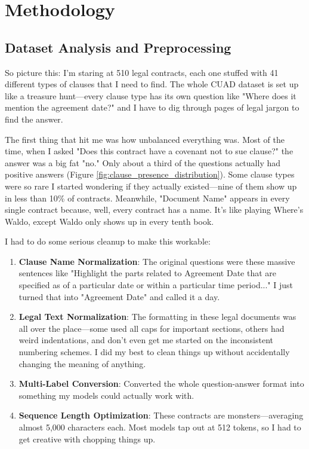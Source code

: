 \section{Methodology}

\subsection{Dataset Analysis and Preprocessing}

So picture this: I'm staring at 510 legal contracts, each one stuffed with 41 different types of clauses that I need to find. The whole CUAD dataset is set up like a treasure hunt—every clause type has its own question like "Where does it mention the agreement date?" and I have to dig through pages of legal jargon to find the answer.

The first thing that hit me was how unbalanced everything was. Most of the time, when I asked "Does this contract have a covenant not to sue clause?" the answer was a big fat "no." Only about a third of the questions actually had positive answers (Figure \ref{fig:clause_presence_distribution}). Some clause types were so rare I started wondering if they actually existed—nine of them show up in less than 10\% of contracts. Meanwhile, "Document Name" appears in every single contract because, well, every contract has a name. It's like playing Where's Waldo, except Waldo only shows up in every tenth book.

I had to do some serious cleanup to make this workable:

\begin{enumerate}
    \item \textbf{Clause Name Normalization}: The original questions were these massive sentences like "Highlight the parts related to Agreement Date that are specified as of a particular date or within a particular time period..." I just turned that into "Agreement Date" and called it a day.
    \item \textbf{Legal Text Normalization}: The formatting in these legal documents was all over the place—some used all caps for important sections, others had weird indentations, and don't even get me started on the inconsistent numbering schemes. I did my best to clean things up without accidentally changing the meaning of anything.
    \item \textbf{Multi-Label Conversion}: Converted the whole question-answer format into something my models could actually work with.
    \item \textbf{Sequence Length Optimization}: These contracts are monsters—averaging almost 5,000 characters each. Most models tap out at 512 tokens, so I had to get creative with chopping things up.
\end{enumerate}

